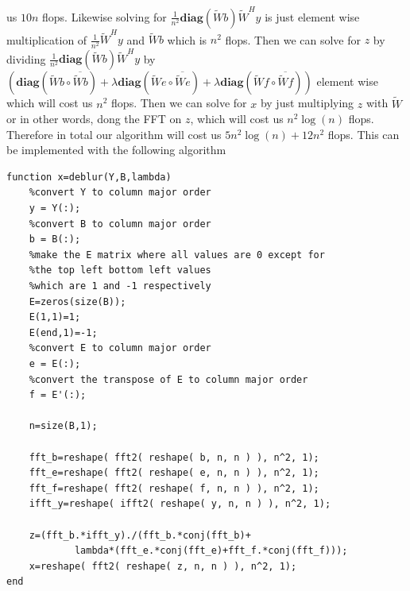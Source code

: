 us $10n$ flops. Likewise solving for $\frac{1}{n^2}\textbf{diag}(\tilde{W}b)\tilde{W}^Hy$
is just element wise multiplication of $\frac{1}{n^2}\tilde{W}^Hy$ and 
$\tilde{W}b$ which is $n^2$ flops. Then we can solve for 
$z$ by dividing $\frac{1}{n^2}\textbf{diag}(\tilde{W}b)\tilde{W}^Hy$
by $\left(\textbf{diag}\left(\tilde{W}b\circ\overline{\tilde{W}b}\right) +\lambda \textbf{diag}\left(\tilde{W}e\circ\overline{\tilde{W}e}\right)
+\lambda \textbf{diag}\left(\tilde{W}f\circ\overline{\tilde{W}f}\right)\right)$
element wise which will cost us $n^2$ flops. Then we can solve for $x$ by 
just multiplying $z$ with $\tilde{W}$ 
or in other words, dong the FFT on $z$, which will cost us $n^2\log(n)$ flops. 
Therefore in total our algorithm will cost us 
$5n^2\log(n)+12n^2$ flops. This can be implemented with the 
following algorithm
\begin{verbatim}
function x=deblur(Y,B,lambda)
    %convert Y to column major order
    y = Y(:);
    %convert B to column major order
    b = B(:);
    %make the E matrix where all values are 0 except for 
    %the top left bottom left values
    %which are 1 and -1 respectively
    E=zeros(size(B));
    E(1,1)=1;
    E(end,1)=-1;
    %convert E to column major order
    e = E(:);
    %convert the transpose of E to column major order
    f = E'(:);
    
    n=size(B,1);

    fft_b=reshape( fft2( reshape( b, n, n ) ), n^2, 1);
    fft_e=reshape( fft2( reshape( e, n, n ) ), n^2, 1);
    fft_f=reshape( fft2( reshape( f, n, n ) ), n^2, 1);
    ifft_y=reshape( ifft2( reshape( y, n, n ) ), n^2, 1);

    z=(fft_b.*ifft_y)./(fft_b.*conj(fft_b)+
            lambda*(fft_e.*conj(fft_e)+fft_f.*conj(fft_f)));
    x=reshape( fft2( reshape( z, n, n ) ), n^2, 1);
end
\end{verbatim}
